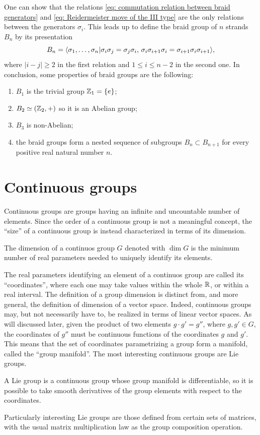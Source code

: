 One can show that the relations \eqref{eq: commutation relation between braid generators} and \eqref{eq: Reidermeister move of the III type} are the only relations between the generators $\sigma_i$. This leads up to define the braid group of $n$ strands $B_n$ by its presentation
\begin{equation}
    B_n = \langle \sigma_1,\dots,\sigma_n | \sigma_i\sigma_j = \sigma_j\sigma_i,\,\sigma_i\sigma_{i+1}\sigma_i = \sigma_{i+1}\sigma_i\sigma_{i+1} \rangle,
\end{equation}
where $|i - j| \ge 2$ in the first relation and $1 \le i \le n - 2$ in the second one. In conclusion, some properties of braid groups are the following:
\begin{enumerate}
    \item $B_1$ is the trivial group $\mathbb{Z}_1 = \{e\}$;
    \item $B_2 \simeq (\mathbb{Z}_2,+)$ so it is an Abelian group;
    \item $B_3$ is non-Abelian;
    \item the braid groups form a nested sequence of subgroups $B_n \subset B_{n + 1}$ for every positive real natural number $n$.
\end{enumerate}

\section{Continuous groups}
Continuous groups are groups having an infinite and uncountable number of elements. Since the order of a continuous group is not a meaningful concept, the ``size'' of a continuous group is instead characterized in terms of its dimension.
\begin{defn}[dimension]
    The dimension of a continuos group $G$ denoted with $\dim{G}$ is the minimum number of real parameters needed to uniquely identify its elements.
\end{defn}
The real parameters identifying an element of a continuos group are called its ``coordinates'', where each one may take values within the whole $\mathbb{R}$, or within a real interval. The definition of a group dimension is distinct from, and more general, the definition of dimension of a vector space. Indeed, continuous groups may, but not necessarily have to, be realized in terms of linear vector spaces. As will discussed later, given the product of two elements $g \cdot g' = g''$, where $g,g' \in G$, the coordinates of $g''$ must be continuous functions of the coordinates $g$ and $g'$. This means that the set of coordinates parametrizing a group form a manifold, called the ``group manifold''. The most interesting continuous groups are Lie groups.
\begin{defn}
    A Lie group is a continuous group whose group manifold is differentiable, so it is possible to take smooth derivatives of the group elements with respect to the coordinates.
\end{defn}
Particularly interesting Lie groups are those defined from certain sets of matrices, with the usual matrix multiplication law as the group composition operation.
